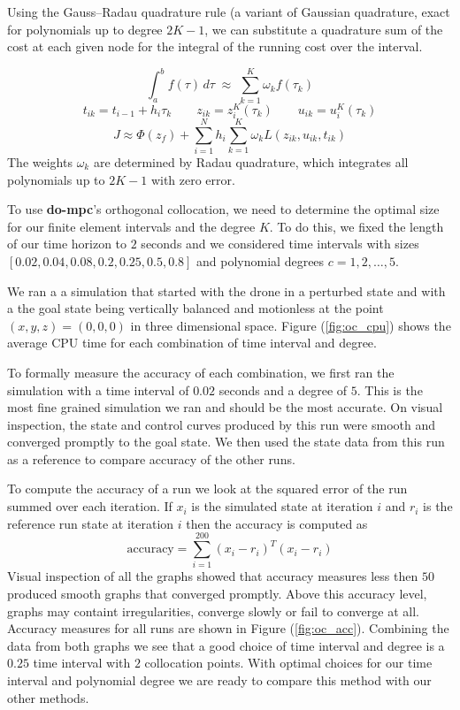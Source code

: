 \documentclass[]{article}
\newcommand{\dompc}{{\bf do-mpc}}
\begin{document}
Using the Gauss–Radau quadrature rule (a variant of Gaussian quadrature, exact for polynomials up to degree $2K-1$, we can substitute a quadrature sum of the cost at each given node for the integral of the running cost over the interval.


\[
\int_a^b f(\tau)\,d\tau \;\approx\; \sum_{k=1}^K \omega_k f(\tau_k)
\]
\[
t_{ik} =  t_{i-1} + h_i\tau_k \qquad z_{ik} = z_i^{K}(\tau_k) \qquad u_{ik} = u_i^{K}(\tau_k)\]
\[
J\approx\Phi(z_f) + \sum_{i=1}^{N}h_i\sum_{k=1}^{K}\omega_kL(z_{ik},u_{ik},t_{ik})
\]
The weights $\omega_k$ are determined by Radau quadrature, which integrates all polynomials up to $2K-1$ with zero error. 

To use {\dompc}'s orthogonal collocation, we need to determine the optimal size for our finite element intervals and the degree $K$.  To do this, we fixed the length of our time horizon to $2$ seconds and we considered  time intervals  with sizes $[0.02, 0.04, 0.08, 0.2, 0.25, 0.5, 0.8]$ and polynomial degrees $c = 1, 2, \ldots, 5$.  

We ran a a simulation that started with the drone in a perturbed state and with a the goal state being vertically balanced and motionless at the point $(x,y,z) = (0, 0, 0)$ in three dimensional space.  Figure (\ref{fig:oc_cpu}) shows the average CPU time for each combination of time interval and degree.

To formally measure the accuracy of each combination, we first ran the simulation with a time interval of $0.02$ seconds and a degree of $5$. This is the most fine grained simulation we ran and should be the most accurate. On visual inspection, the state and control curves produced by this run were smooth and converged promptly to the goal state. We then used the state data from this run as a reference to compare accuracy of the other runs. 

To compute the accuracy of a run we look at the squared error of the run summed over each iteration.  If $x_i$ is the simulated state at iteration $i$ and $r_i$ is the reference run state at iteration $i$ then the accuracy is computed as 
\[\text{accuracy} =  \sum_{i=1}^{200} (x_i - r_i)^T(x_i - r_i)\]
Visual inspection of all the graphs showed that  accuracy measures less then $50$ produced smooth graphs that converged promptly. Above this accuracy level, graphs may containt irregularities, converge slowly or fail to converge at all. Accuracy measures for all runs are shown in Figure (\ref{fig:oc_acc}). Combining the data from both graphs we see that a good choice of time interval and degree is a $0.25$  time interval with $2$ collocation points.  With optimal choices for our time interval and polynomial degree we are ready to compare this method with our other methods.
\end{document}
